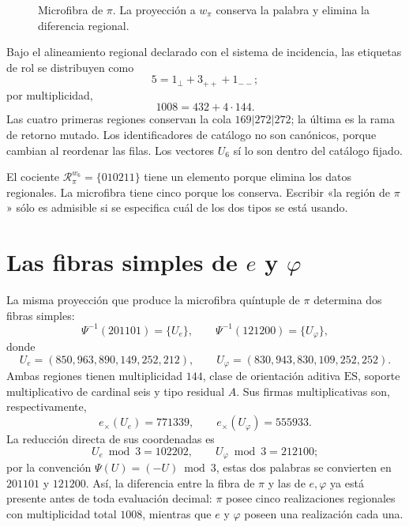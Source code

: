 \begin{figure}[p]
\centering
\resizebox{.96\textwidth}{!}{}
\caption{Microfibra de \(\pi\). La proyección a \(w_\pi\) conserva la
palabra y elimina la diferencia regional.}
\label{fig:cinco-pi}
\end{figure}

Bajo el alineamiento regional declarado con el sistema de incidencia, las
etiquetas de rol se distribuyen como
\[
5=1_\perp+3_{++}+1_{--};
\]
por multiplicidad,
\[
1008=432+4\cdot144.
\]
Las cuatro primeras regiones conservan la cola \(169|272|272\); la última es
la rama de retorno mutado. Los identificadores de catálogo no son canónicos,
porque cambian al reordenar las filas. Los vectores \(U_6\) sí lo son dentro
del catálogo fijado.

\begin{remark}
El cociente
\(\mathscr R_\pi^{w_6}=\{010211\}\) tiene un elemento porque elimina los datos
regionales. La microfibra tiene cinco porque los conserva. Escribir «la región
de \(\pi\)» sólo es admisible si se especifica cuál de los dos tipos se está
usando.
\end{remark}

\section{Las fibras simples de \texorpdfstring{\(e\)}{e} y
\texorpdfstring{\(\varphi\)}{phi}}

La misma proyección que produce la microfibra quíntuple de \(\pi\)
determina dos fibras simples:
\[
 \Psi^{-1}(201101)=\{U_e\},
 \qquad
 \Psi^{-1}(121200)=\{U_\varphi\},
\]
donde
\[
 U_e=(850,963,890,149,252,212),
 \qquad
 U_\varphi=(830,943,830,109,252,252).
\]
Ambas regiones tienen multiplicidad \(144\), clase de orientación aditiva
\(\mathrm{ES}\), soporte multiplicativo de cardinal seis y tipo residual
\(A\). Sus firmas multiplicativas
son, respectivamente,
\[
 e_\times(U_e)=771339,
 \qquad
 e_\times(U_\varphi)=555933.
\]
La reducción directa de sus coordenadas es
\[
 U_e\bmod3=102202,
 \qquad
 U_\varphi\bmod3=212100;
\]
por la convención \(\Psi(U)=(-U)\bmod3\), estas dos palabras se convierten
en \(201101\) y \(121200\). Así, la diferencia entre la fibra de \(\pi\) y
las de \(e,\varphi\) ya está presente antes de toda evaluación decimal:
\(\pi\) posee cinco realizaciones regionales con multiplicidad total
\(1008\), mientras que \(e\) y \(\varphi\) poseen una realización cada una.

